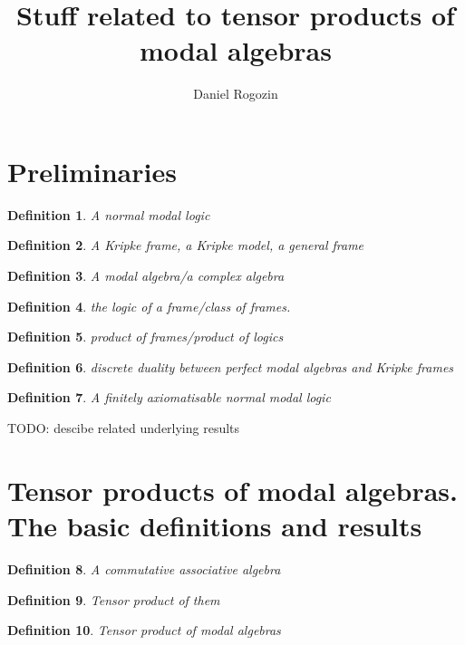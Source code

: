 \documentclass[a4paper]{article}
\author{Daniel Rogozin}
\date{}
\title{Stuff related to tensor products of modal algebras}
\theoremstyle{defin}
\newtheorem{defin}{Definition}
\theoremstyle{theorem}
\theoremstyle{prop}
\theoremstyle{lemma}
\theoremstyle{ex}
\theoremstyle{col}
\begin{document}
\maketitle

\nocite{*}

\section{Preliminaries}

\begin{defin} A normal modal logic
\end{defin}

\begin{defin} A Kripke frame, a Kripke model, a general frame
\end{defin}

\begin{defin} A modal algebra/a complex algebra
\end{defin}

\begin{defin} the logic of a frame/class of frames.
\end{defin}

\begin{defin} product of frames/product of logics
\end{defin}

\begin{defin} discrete duality between perfect modal algebras and Kripke frames
\end{defin}

\begin{defin} A finitely axiomatisable normal modal logic
\end{defin}

TODO: descibe related underlying results

\section{Tensor products of modal algebras. The basic definitions and results}

\begin{defin} A commutative associative algebra
\end{defin}

\begin{defin} Tensor product of them
\end{defin}

\begin{defin} Tensor product of modal algebras
\end{defin}
\end{document}
